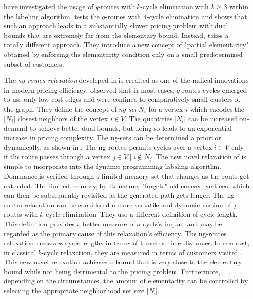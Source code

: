 \textcite{irnich2006, fukasawa2006} have investigated the usage of
$q$-routes with $k$-cycle elimination with $k \ge 3$ within the labeling algorithm.
\textcite{fukasawa2006} tests the $q$-routes with $4$-cycle elimination
and shows that such an approach leads to a substantially slower pricing problem
with dual bounds that are extremely far from the elementary bound.
Instead, \textcite{desaulniers2008} takes a totally different approach.
They introduce a new concept of "partial elementarity"
obtained by enforcing the elementarity condition
only on a small predetermined subset of customers.

The \textit{ng-routes relaxation} developed in \textcite{baldacci2011}
is credited as one of the radical innovations in modern pricing efficiency.
\citeauthor{baldacci2011} observed that in most cases,
$q$-routes cycles emerged to use only low-cost edges
and were confined to comparatively small clusters of the graph.
They define the concept of \textit{ng-set} $N_i$ for a vertex $i$
which encodes the $|N_i|$ closest neighbors of the vertex $i \in V$.
The quantities $|N_i|$ can be increased on-demand to achieve better dual bounds,
but doing so leads to an exponential increase in pricing complexity.
The ng-sets can be determined a priori or dynamically, as shown in \textcite{roberti2014}.
The ng-routes permits cycles over a vertex $i \in V$ only if the route
passes through a vertex $j \in V \mid i \notin N_j$.
The new novel relaxation of \citeauthor{baldacci2011}
is simple to incorporate into the dynamic programming labeling algorithm.
Dominance is verified through a limited-memory set
that changes as the route get extended.
The limited memory, by its nature,
"forgets" old covered vertices,
which can then be subsequently revisited
as the generated path gets longer.
The ng-routes relaxation can be considered a more versatile and dynamic version
of $q$-routes with $k$-cycle elimination.
They use a different definition of cycle length.
This definition provides a better measure of a cycle's impact
and may be regarded as the primary cause of this relaxation's efficiency.
The ng-routes relaxation measures cycle lengths in terms of travel or time distances.
In contrast, in classical $k$-cycle relaxation,
they are measured in terms of customers visited \parencite{contardo2014}.
This new novel relaxation achieves a bound that is very close to the elementary bound
while not being detrimental to the pricing problem.
Furthermore, depending on the circumstances,
the amount of elementarity can be controlled by selecting the appropriate
neighborhood set size $|N_i|$.

